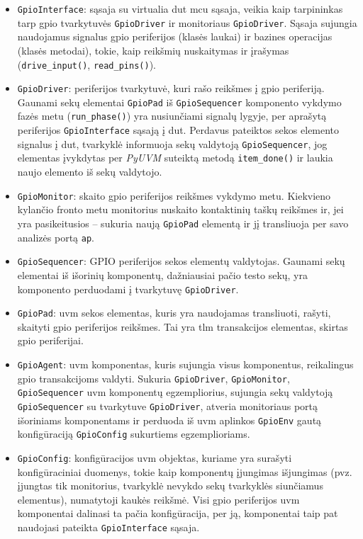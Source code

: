 \begin{itemize}
	\item \texttt{GpioInterface}: sąsaja su virtualia \gls{dut} \gls{mcu} sąsaja, veikia kaip tarpininkas tarp \gls{gpio} tvarkytuvės \texttt{GpioDriver} ir monitoriaus \texttt{GpioDriver}. Sąsaja sujungia naudojamus signalus \gls{gpio} periferijos (klasės laukai) ir bazines operacijas (klasės metodai), tokie, kaip reikšmių nuskaitymas ir įrašymas (\texttt{drive\_input()}, \texttt{read\_pins()}).
	\item \texttt{GpioDriver}: periferijos tvarkytuvė, kuri rašo reikšmes į \gls{gpio} periferiją. Gaunami sekų elementai \texttt{GpioPad} iš \texttt{GpioSequencer} komponento vykdymo fazės metu (\texttt{run\_phase()}) yra nusiunčiami signalų lygyje, per aprašytą periferijos \texttt{GpioInterface} sąsają į \gls{dut}. Perdavus pateiktos sekos elemento signalus į \gls{dut}, tvarkyklė informuoja sekų valdytoją \texttt{GpioSequencer}, jog elementas įvykdytas per \textit{PyUVM} suteiktą metodą \texttt{item\_done()} ir laukia naujo elemento iš sekų valdytojo.
	\item \texttt{GpioMonitor}: skaito \gls{gpio} periferijos  reikšmes vykdymo metu. Kiekvieno kylančio  fronto metu monitorius nuskaito kontaktinių taškų reikšmes ir, jei yra pasikeitusios -- sukuria naują \texttt{GpioPad} elementą ir jį transliuoja per savo analizės portą \texttt{ap}.
	\item \texttt{GpioSequencer}: GPIO periferijos sekos elementų valdytojas. Gaunami sekų elementai iš išorinių komponentų, dažniausiai pačio testo sekų, yra komponento perduodami į tvarkytuvę \texttt{GpioDriver}.
	\item \texttt{GpioPad}: \gls{uvm} sekos elementas, kuris yra naudojamas transliuoti, rašyti, skaityti \gls{gpio} periferijos  reikšmes. Tai yra \gls{tlm} transakcijos elementas, skirtas \gls{gpio} periferijai.
	\item \texttt{GpioAgent}: \gls{uvm} komponentas, kuris sujungia visus komponentus, reikalingus \gls{gpio} transakcijoms valdyti. Sukuria \texttt{GpioDriver}, \texttt{GpioMonitor}, \texttt{GpioSequencer} \gls{uvm} komponentų egzempliorius, sujungia sekų valdytoją \texttt{GpioSequencer} su tvarkytuve \texttt{GpioDriver}, atveria monitoriaus portą išoriniams komponentams ir perduoda iš \gls{uvm} aplinkos \texttt{GpioEnv} gautą konfigūraciją \texttt{GpioConfig} sukurtiems egzemplioriams.
	\item \texttt{GpioConfig}: konfigūracijos \gls{uvm} objektas, kuriame yra surašyti konfigūraciniai duomenys, tokie kaip komponentų įjungimas išjungimas (pvz. įjungtas tik monitorius, tvarkyklė nevykdo sekų tvarkyklės siunčiamus elementus), numatytoji kaukės reikšmė. Visi \gls{gpio} periferijos \gls{uvm} komponentai dalinasi ta pačia konfigūracija, per ją, komponentai taip pat naudojasi pateikta \texttt{GpioInterface} sąsaja.
\end{itemize}

